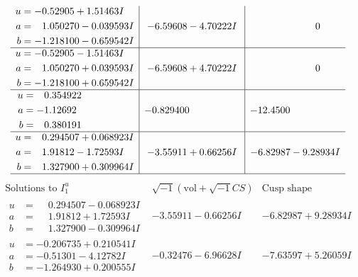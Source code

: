 \documentclass[1p]{elsarticle_modified}
\theoremstyle{definition}
\newcommand{\I}{\sqrt{-1}}
\begin{document}
$$\begin{array}{c|c|c}
\begin{aligned}
u &= -0.52905 + 1.51463 I \\
a &= \phantom{-}1.050270 - 0.039593 I \\
b &= -1.218100 - 0.659542 I\end{aligned}
 & -6.59608 - 4.70222 I & \phantom{-0.000000 } 0 \\ \hline\begin{aligned}
u &= -0.52905 - 1.51463 I \\
a &= \phantom{-}1.050270 + 0.039593 I \\
b &= -1.218100 + 0.659542 I\end{aligned}
 & -6.59608 + 4.70222 I & \phantom{-0.000000 } 0 \\ \hline\begin{aligned}
u &= \phantom{-}0.354922\phantom{ +0.000000I} \\
a &= -1.12692\phantom{ +0.000000I} \\
b &= \phantom{-}0.380191\phantom{ +0.000000I}\end{aligned}
 & -0.829400\phantom{ +0.000000I} & -12.4500\phantom{ +0.000000I} \\ \hline\begin{aligned}
u &= \phantom{-}0.294507 + 0.068923 I \\
a &= \phantom{-}1.91812 - 1.72593 I \\
b &= \phantom{-}1.327900 + 0.309964 I\end{aligned}
 & -3.55911 + 0.66256 I & -6.82987 - 9.28934 I\\
 \hline 
 \end{array}$$\newpage$$\begin{array}{c|c|c}  
\text{Solutions to }I^u_{1}& \I (\text{vol} + \sqrt{-1}CS) & \text{Cusp shape}\\
 \hline 
\begin{aligned}
u &= \phantom{-}0.294507 - 0.068923 I \\
a &= \phantom{-}1.91812 + 1.72593 I \\
b &= \phantom{-}1.327900 - 0.309964 I\end{aligned}
 & -3.55911 - 0.66256 I & -6.82987 + 9.28934 I \\ \hline\begin{aligned}
u &= -0.206735 + 0.210541 I \\
a &= -0.51301 - 4.12782 I \\
b &= -1.264930 + 0.200555 I\end{aligned}
 & -0.32476 - 6.96628 I & -7.63597 + 5.26059 I \\ \hline\begin{aligned}

\end{aligned}
\end{array}$$
\end{document}
